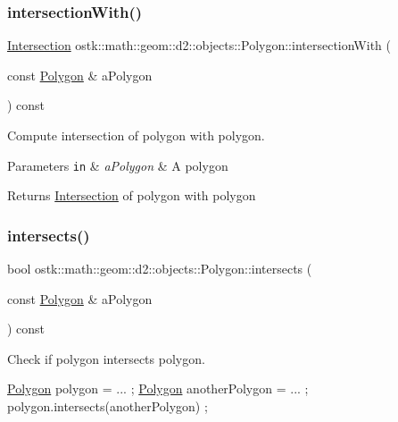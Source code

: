 \subsubsection{\texorpdfstring{intersection\+With()}{intersectionWith()}}
{\footnotesize\ttfamily \hyperlink{classostk_1_1math_1_1geom_1_1d2_1_1_intersection}{Intersection} ostk\+::math\+::geom\+::d2\+::objects\+::\+Polygon\+::intersection\+With (\begin{DoxyParamCaption}\item[{const \hyperlink{classostk_1_1math_1_1geom_1_1d2_1_1objects_1_1_polygon}{Polygon} \&}]{a\+Polygon }\end{DoxyParamCaption}) const}



Compute intersection of polygon with polygon. 


\begin{DoxyParams}[1]{Parameters}
\mbox{\tt in}  & {\em a\+Polygon} & A polygon \\
\hline
\end{DoxyParams}
\begin{DoxyReturn}{Returns}
\hyperlink{classostk_1_1math_1_1geom_1_1d2_1_1_intersection}{Intersection} of polygon with polygon 
\end{DoxyReturn}
\mbox{\label{classostk_1_1math_1_1geom_1_1d2_1_1objects_1_1_polygon_ad0183cbb840fe9f1fb9dfde0cc3eae50}} 
\subsubsection{\texorpdfstring{intersects()}{intersects()}}
{\footnotesize\ttfamily bool ostk\+::math\+::geom\+::d2\+::objects\+::\+Polygon\+::intersects (\begin{DoxyParamCaption}\item[{const \hyperlink{classostk_1_1math_1_1geom_1_1d2_1_1objects_1_1_polygon}{Polygon} \&}]{a\+Polygon }\end{DoxyParamCaption}) const}



Check if polygon intersects polygon. 


\begin{DoxyCode}
\hyperlink{classostk_1_1math_1_1geom_1_1d2_1_1objects_1_1_polygon_adaf9ef564754ab10ed3dd0d5fa0d90ea}{Polygon} polygon = ... ;
\hyperlink{classostk_1_1math_1_1geom_1_1d2_1_1objects_1_1_polygon_adaf9ef564754ab10ed3dd0d5fa0d90ea}{Polygon} anotherPolygon = ... ;
polygon.intersects(anotherPolygon) ;
\end{DoxyCode}



